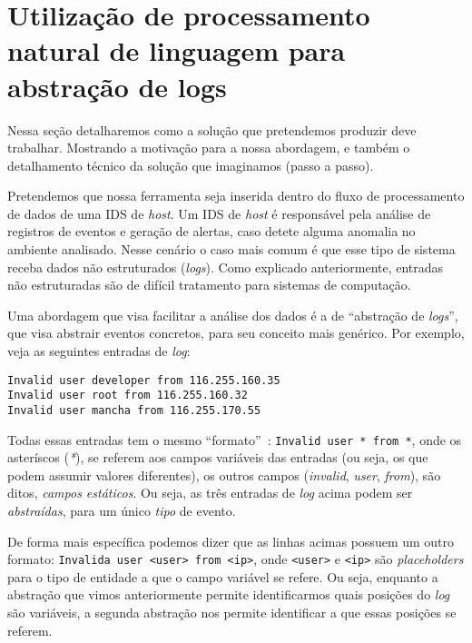 \documentclass[
	12pt,				%
	openright,			%
	twoside,			%
	a4paper,			%
	english,			%
	spanish,			%
	brazil,				%
	]{abntex2}
\begin{document}

\chapter{Utilização de processamento natural de linguagem para abstração de logs}\label{chap:proposta}

Nessa seção detalharemos como a solução que pretendemos produzir deve trabalhar. Mostrando a motivação para a nossa abordagem, e também o detalhamento técnico da solução que imaginamos (passo a passo).

Pretendemos que nossa ferramenta seja inserida dentro do fluxo de processamento de dados de uma IDS de \emph{host}. Um IDS de \emph{host} é responsável pela análise de registros de eventos e geração de alertas, caso detete alguma anomalia no ambiente analisado. Nesse cenário o caso mais comum é que esse tipo de sistema receba dados não estruturados (\emph{logs}). Como explicado anteriormente, entradas não estruturadas são de difícil tratamento para sistemas de computação.


Uma abordagem que visa facilitar a análise dos dados é a de ``abstração de \emph{logs}'', que visa abstrair eventos concretos, para seu conceito mais genérico. Por exemplo, veja as seguintes entradas de \emph{log}:

\begin{verbatim}
Invalid user developer from 116.255.160.35
Invalid user root from 116.255.160.32
Invalid user mancha from 116.255.170.55
\end{verbatim}

Todas essas entradas tem o mesmo ``formato''~: \verb|Invalid user * from *|, onde os asteríscos (\emph{*}), se referem aos campos variáveis das entradas (ou seja, os que podem assumir valores diferentes), os outros campos (\emph{invalid}, \emph{user}, \emph{from}), são ditos, \emph{campos estáticos}. Ou seja, as três entradas de \emph{log} acima podem ser \emph{abstraídas}, para um único \emph{tipo} de evento.

De forma mais específica podemos dizer que as linhas acimas possuem um outro formato: \verb|Invalida user <user> from <ip>|, onde \verb|<user>| e \verb|<ip>| são \emph{placeholders} para o tipo de entidade a que o campo variável se refere. Ou seja, enquanto a abstração que vimos anteriormente permite identificarmos quais posições do \emph{log} são variáveis, a segunda abstração nos permite identificar a que essas posições se referem.
\end{document}

